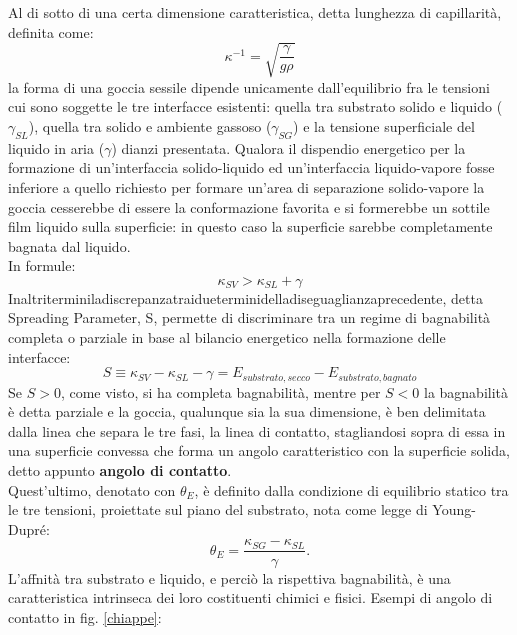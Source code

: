 \documentclass[letterpaper,12pt]{article}
\begin{document}
Al di sotto di una certa dimensione caratteristica, detta lunghezza di capillarità, definita come:
\begin{equation}
	\kappa^{-1}=\sqrt{\frac{\gamma}{g \rho}}
\end{equation}
 la forma di una goccia sessile dipende unicamente dall'equilibrio fra le tensioni cui sono soggette le tre interfacce esistenti: quella tra substrato solido e liquido ($\gamma_{SL}$), quella tra solido e ambiente gassoso ($\gamma_{SG}$) e la tensione superficiale del liquido in aria ($\gamma$) dianzi presentata. Qualora il dispendio energetico per la formazione di un'interfaccia solido-liquido ed un'interfaccia liquido-vapore fosse inferiore a quello richiesto per formare un'area di separazione solido-vapore la goccia cesserebbe di essere la conformazione favorita e si formerebbe un sottile film liquido sulla superficie: in questo caso la superficie sarebbe completamente bagnata dal liquido.\\
 In formule:
 \begin{equation}
 \kappa_{SV}>\kappa_{SL}+\gamma
\end{equation}
Inaltriterminiladiscrepanzatraidueterminidelladiseguaglianzaprecedente, detta Spreading Parameter, S, permette di discriminare tra un regime di bagnabilità completa o parziale in base al bilancio energetico nella formazione delle interfacce:
 \begin{equation}
S\equiv\kappa_{SV}-\kappa_{SL}-\gamma=E_{substrato,secco}-E_{substrato,bagnato}
\end{equation}
Se $S > 0$, come visto, si ha completa bagnabilità, mentre per $S < 0$ la bagnabilità è detta parziale e la goccia, qualunque sia la sua dimensione, è ben delimitata dalla linea che separa le tre fasi, la linea di contatto, stagliandosi sopra di essa in una superficie convessa che forma un angolo caratteristico con la superficie solida, detto appunto \textbf{angolo di contatto}. \\
Quest'ultimo, denotato con $\theta_E$, è definito dalla condizione di equilibrio statico tra le tre tensioni, proiettate sul piano del substrato, nota come legge di Young-Dupré:
 \begin{equation}
\theta_E=\frac{\kappa_{SG}-\kappa_{SL}}{\gamma}.
\end{equation}
L'affnità tra substrato e liquido, e perciò la rispettiva bagnabilità, è una caratteristica intrinseca dei loro costituenti chimici e fisici. 
Esempi di angolo di contatto in fig. \ref{chiappe}:
\end{document}
